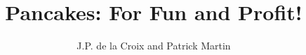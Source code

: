 \documentclass[11pt]{book}
\begin{document}
\title{Pancakes: For Fun and Profit!}
\author{J.P. de la Croix and Patrick Martin}
\date{}
\maketitle



\end{document}
